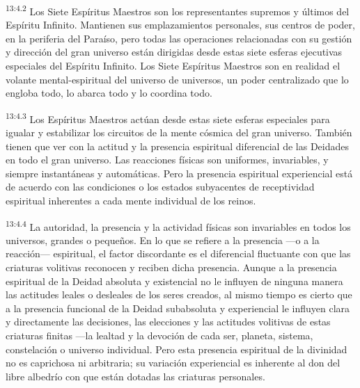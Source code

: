 \par
\textsuperscript{13:4.2} Los Siete Espíritus Maestros son los representantes supremos y últimos del Espíritu Infinito. Mantienen sus emplazamientos personales, sus centros de poder, en la periferia del Paraíso, pero todas las operaciones relacionadas con su gestión y dirección del gran universo están dirigidas desde estas siete esferas ejecutivas especiales del Espíritu Infinito. Los Siete Espíritus Maestros son en realidad el volante mental-espiritual del universo de universos, un poder centralizado que lo engloba todo, lo abarca todo y lo coordina todo.

\par
\textsuperscript{13:4.3} Los Espíritus Maestros actúan desde estas siete esferas especiales para igualar y estabilizar los circuitos de la mente cósmica del gran universo. También tienen que ver con la actitud y la presencia espiritual diferencial de las Deidades en todo el gran universo. Las reacciones físicas son uniformes, invariables, y siempre instantáneas y automáticas. Pero la presencia espiritual experiencial está de acuerdo con las condiciones o los estados subyacentes de receptividad espiritual inherentes a cada mente individual de los reinos.

\par
\textsuperscript{13:4.4} La autoridad, la presencia y la actividad físicas son invariables en todos los universos, grandes o pequeños. En lo que se refiere a la presencia ---o a la reacción--- espiritual, el factor discordante es el diferencial fluctuante con que las criaturas volitivas reconocen y reciben dicha presencia. Aunque a la presencia espiritual de la Deidad absoluta y existencial no le influyen de ninguna manera las actitudes leales o desleales de los seres creados, al mismo tiempo es cierto que a la presencia funcional de la Deidad subabsoluta y experiencial le influyen clara y directamente las decisiones, las elecciones y las actitudes volitivas de estas criaturas finitas ---la lealtad y la devoción de cada ser, planeta, sistema, constelación o universo individual. Pero esta presencia espiritual de la divinidad no es caprichosa ni arbitraria; su variación experiencial es inherente al don del libre albedrío con que están dotadas las criaturas personales.


